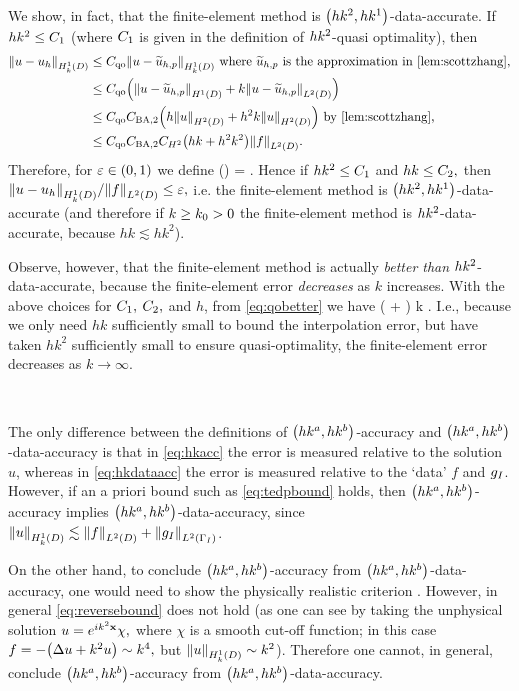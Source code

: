 We show, in fact, that the finite-element method is $\hk{2}{1}$-data-accurate. If $hk^2 \leq C_{1}$ (where $C_{1}$ is given in the definition of $hk^{2}$-quasi optimality), then
\begin{align}
  \NHokD{u-\uh} &\leq \Cqo \NHokD{u-\uhptilde}\text{ where } \uhptilde \text{ is the approximation in \cref{lem:scottzhang},}\nonumber\\
  &\leq \Cqo \mleft(\NHoD{u-\uhptilde} + k\NLtD{u-\uhptilde}\mright)\nonumber\\
  &\leq \Cqo \CSZfn{2} \mleft(h\NHtD{u} + h^2k\NHtD{u}\mright) \text{ by \cref{lem:scottzhang},}\nonumber\\
    &\leq \Cqo \CSZfn{2}\CHt\mleft(hk + h^2k^2\mright)\NLtD{f}.\label{eq:qobetter}
\end{align}
Therefore, for $\varepsilon \in (0,1)$ we define
\beqs
\Ct(\eps) =  \min\set{\eps,\sqrt{\eps}}.
\eeqs
\ere
Hence if $hk^2 \leq C_{1}$ and $hk \leq C_{2},$ then $\NHokD{u-\uh}/\NLtD{f} \leq \eps,$ i.e. the finite-element method is $\hk{2}{1}$-data-accurate (and therefore if $k \geq k_{0}>0$ the finite-element method is $hk^{2}$-data-accurate, because $hk\lesssim hk^2$).

Observe, however, that the finite-element method is actually \emph{better than} $hk^{2}$-data-accurate, because the finite-element error \emph{decreases} as $k$ increases. With the above choices for $C_{1},$ $C_{2},$ and $h$, from \cref{eq:qobetter} we have
\beqs
{} \leq \Cqo {} \mleft( + \mright)  \quad\tas k \rightarrow \infty.
\eeqs
I.e., because we only need $hk$ sufficiently small to bound the interpolation error, but have taken $hk^2$ sufficiently small to ensure quasi-optimality, the finite-element error decreases as $k \rightarrow \infty.$


\label{rem:accuracy}

\

The only difference between the definitions of $\hk{a}{b}$-accuracy and $\hk{a}{b}$-data-accuracy is that in \cref{eq:hkacc} the error is measured relative to the solution $u$, whereas in \cref{eq:hkdataacc} the error is measured relative to the `data' $f$ and $g_{I}$. However, if an a priori bound such as \cref{eq:tedpbound} holds, then $\hk{a}{b}$-accuracy implies $\hk{a}b$-data-accuracy, since $\NHokD{u} \lesssim \NLtD{f} + \NLtGI{\gI}$.

On the other hand, to conclude $\hk{a}{b}$-accuracy from $\hk{a}b$-data-accuracy, one would need to show the physically realistic criterion
\beq\label{eq:reversebound}
 \lesssim {}.
\eeq
However, in general \cref{eq:reversebound} does not hold (as one can see by taking the unphysical solution $u=e^{ik^2 \mathbf{x}}\chi,$ where $\chi$ is a smooth cut-off function; in this case $f = -\mleft(\Lap u + k^2 u\mright) \sim k^4,$ but $\NHokD{u} \sim k^2$). Therefore one cannot, in general, conclude $\hk{a}{b}$-accuracy from $\hk{a}{b}$-data-accuracy.
\ere

